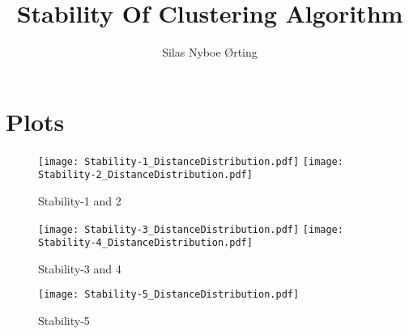 \documentclass[a4paper]{article}
\begin{document}
\title{\vspace{-2.5cm}Stability Of Clustering Algorithm}
\author{Silas Nyboe Ørting}
\maketitle
\thispagestyle{empty}



\pagebreak
\section{Plots}
\begin{figure}[!h]
  \centering
  \texttt{[image: Stability-1\_DistanceDistribution.pdf]}
  \texttt{[image: Stability-2\_DistanceDistribution.pdf]}
  \caption{Stability-1 and 2}
  \label{fig:stability-1-2}
\end{figure}

\begin{figure}[!h]
  \centering
  \texttt{[image: Stability-3\_DistanceDistribution.pdf]}
  \texttt{[image: Stability-4\_DistanceDistribution.pdf]}
  \caption{Stability-3 and 4}
  \label{fig:stability-3-4}
\end{figure}

\begin{figure}[!h]
  \centering
  \texttt{[image: Stability-5\_DistanceDistribution.pdf]}
  \caption{Stability-5}
  \label{fig:stability-5}
\end{figure}
\end{document}
